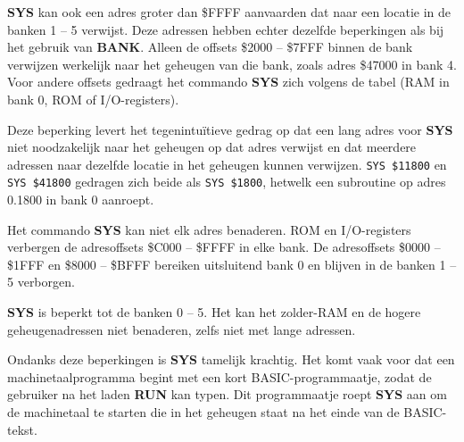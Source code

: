 {\bf SYS} kan ook een adres groter dan \$FFFF aanvaarden dat naar een locatie in de banken 1 -- 5 verwijst. Deze adressen hebben echter dezelfde beperkingen als bij het gebruik van {\bf BANK}. Alleen de offsets \$2000 -- \$7FFF binnen de bank verwijzen werkelijk naar het geheugen van die bank, zoals adres \$47000 in bank 4. Voor andere offsets gedraagt het commando {\bf SYS} zich volgens de tabel (RAM in bank 0, ROM of I/O-registers).

Deze beperking levert het tegenintuïtieve gedrag op dat een lang adres voor {\bf SYS} niet noodzakelijk naar het geheugen op dat adres verwijst en dat meerdere adressen naar dezelfde locatie in het geheugen kunnen verwijzen. \texttt{SYS \$11800} en \texttt{SYS \$41800} gedragen zich beide als \texttt{SYS \$1800}, hetwelk een subroutine op adres 0.1800 in bank 0 aanroept.


Het commando {\bf SYS} kan niet elk adres benaderen. ROM en I/O-registers verbergen de adresoffsets \$C000 -- \$FFFF in elke bank. De adresoffsets \$0000 -- \$1FFF en \$8000 -- \$BFFF bereiken uitsluitend bank 0 en blijven in de banken 1 -- 5 verborgen.

{\bf SYS} is beperkt tot de banken 0 -- 5. Het kan het zolder-RAM en de hogere geheugenadressen niet benaderen, zelfs niet met lange adressen.

Ondanks deze beperkingen is {\bf SYS} tamelijk krachtig. Het komt vaak voor dat een machinetaalprogramma begint met een kort BASIC-programmaatje, zodat de gebruiker na het laden {\bf RUN} kan typen. Dit programmaatje roept {\bf SYS} aan om de machinetaal te starten die in het geheugen staat na het einde van de BASIC-tekst.


